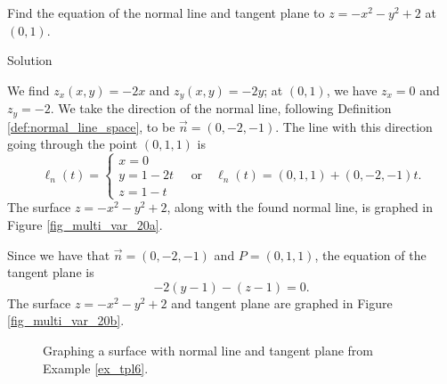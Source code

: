 \ifcalculus\pagebreak\fi
\begin{example}\label{ex_tpl6}
Find the equation of the normal line and tangent plane to $z=-x^2-y^2+2$ at $(0,1)$.

\pagebreak
{}Solution 

We find $z_x(x,y) = -2x$ and $z_y(x,y) = -2y$; at $(0,1)$, we have $z_x = 0$ and $z_y = -2$. We take the direction of the normal line, following Definition \ref{def:normal_line_space}, to be $\vec n=\left( 0,-2,-1\right)$. The line with this direction going through the point $(0,1,1)$ is 
$$\ell_n(t) = \left\{\begin{array}{l} x=0\\y=1-2t\\z=1-t\end{array}\right.\quad \text{or}\quad \ell_n(t)=\left( 0,1,1\right)+\left( 0,-2,-1\right) t.$$
The surface $z=-x^2-y^2+2$, along with the found normal line, is graphed in Figure \ref{fig_multi_var_20a}. 

Since we have that $\vec n = \left( 0,-2,-1\right)$ and $P = (0,1,1)$,  the equation of the tangent plane is 
$$-2(y-1)-(z-1)=0.$$
The surface $z=-x^2-y^2+2$ and tangent plane are graphed in Figure \ref{fig_multi_var_20b}. 

\begin{figure}[H]
\centering
\qquad
{}
\caption{Graphing a surface with  normal line and tangent plane from Example \ref{ex_tpl6}.}
\end{figure}
\end{example}


